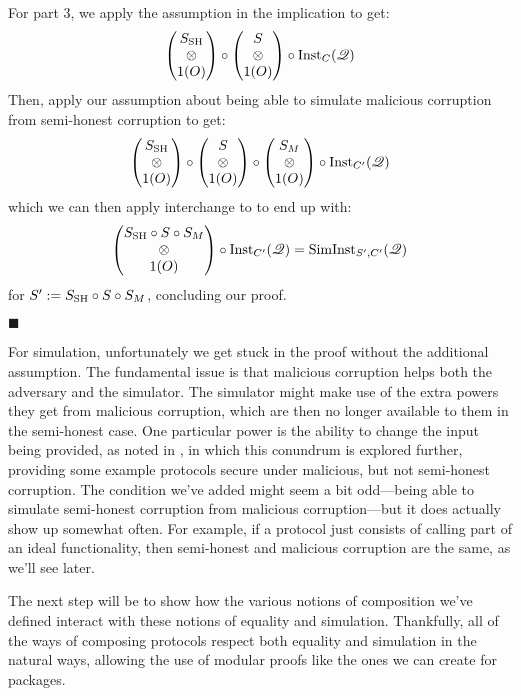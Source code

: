 \begin{theorem}
  For part 3, we apply the assumption in the implication to get:
  $$
  \begin{pmatrix}
    S_{\text{SH}}\cr
    \otimes\cr
    1(O)
  \end{pmatrix}
  \circ
  \begin{pmatrix}
    S\cr
    \otimes\cr
    1(O)
  \end{pmatrix}
  \circ \text{Inst}_{C}(\mathscr{Q})
  $$
  Then, apply our assumption about being able to simulate malicious corruption
  from semi-honest corruption to get:
  $$
  \begin{pmatrix}
    S_{\text{SH}}\cr
    \otimes\cr
    1(O)
  \end{pmatrix}
  \circ
  \begin{pmatrix}
    S\cr
    \otimes\cr
    1(O)
  \end{pmatrix}
  \circ
  \begin{pmatrix}
    S_M\cr
    \otimes\cr
    1(O)
  \end{pmatrix}
  \circ \text{Inst}_{C'}(\mathscr{Q})
  $$
  which we can then apply interchange to to end up with:
  $$
  \begin{pmatrix}
    S_{\text{SH}} \circ S \circ S_M\cr
    \otimes\cr
    1(O)
  \end{pmatrix}
  \circ \text{Inst}_{C'}(\mathscr{Q})
  = \text{SimInst}_{S', C'}(\mathscr{Q})
  $$
  for $S' := S_{\text{SH}} \circ S \circ S_M$, concluding our proof.

  $\blacksquare$
\end{theorem}

For simulation, unfortunately we get stuck in the proof without the additional
assumption.
The fundamental issue is that malicious corruption helps both
the adversary and the simulator.
The simulator might make use of the extra powers they get
from malicious corruption, which are then no longer available
to them in the semi-honest case.
One particular power is the ability to change the input being
provided, as noted in
\cite{EPRINT:HazLin10a}, in which this conundrum
is explored further, providing
some example protocols secure under malicious, but not semi-honest corruption.
The condition we've added might seem a bit odd---being able to simulate
semi-honest corruption from malicious corruption---but it does actually show up somewhat often.
For example, if a protocol just consists of calling part of an ideal
functionality, then semi-honest and malicious corruption
are the same, as we'll see later.

The next step will be to show how the various notions of composition
we've defined interact with these notions of equality and simulation.
Thankfully, all of the ways of composing protocols
respect both equality and simulation in the natural ways,
allowing the use of modular proofs like the ones we can create
for packages.

